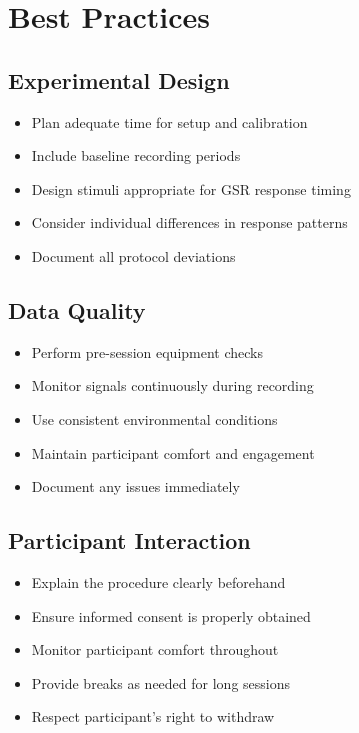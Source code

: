 \section{Best Practices}

\subsection{Experimental Design}

\begin{itemize}
\item Plan adequate time for setup and calibration
\item Include baseline recording periods
\item Design stimuli appropriate for GSR response timing
\item Consider individual differences in response patterns
\item Document all protocol deviations
\end{itemize}

\subsection{Data Quality}

\begin{itemize}
\item Perform pre-session equipment checks
\item Monitor signals continuously during recording
\item Use consistent environmental conditions
\item Maintain participant comfort and engagement
\item Document any issues immediately
\end{itemize}

\subsection{Participant Interaction}

\begin{itemize}
\item Explain the procedure clearly beforehand
\item Ensure informed consent is properly obtained
\item Monitor participant comfort throughout
\item Provide breaks as needed for long sessions
\item Respect participant's right to withdraw
\end{itemize}

